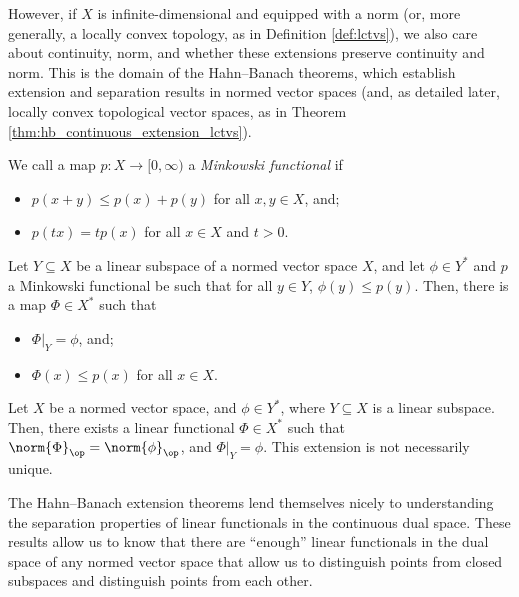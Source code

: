 However, if $X$ is infinite-dimensional and equipped with a norm (or, more generally, a locally convex topology, as in Definition \ref{def:lctvs}), we also care about continuity, norm, and whether these extensions preserve continuity and norm. This is the domain of the Hahn--Banach theorems, which establish extension and separation results in normed vector spaces (and, as detailed later, locally convex topological vector spaces, as in Theorem \ref{thm:hb_continuous_extension_lctvs}).
\begin{definition}
  We call a map $p\colon X\rightarrow [0,\infty)$ a \textit{Minkowski functional} if
  \begin{itemize}
    \item $p\left(x + y\right)\leq p\left(x\right) + p\left(y\right)$ for all $x,y\in X$, and;
    \item $p\left(tx\right) = tp\left(x\right)$ for all $x\in X$ and $t > 0$.
  \end{itemize}
\end{definition}
\begin{theorem}\label{thm:hbm_extension}
  Let $Y\subseteq X$ be a linear subspace of a normed vector space $X$, and let $\phi\in Y^{\ast}$ and $p$ a Minkowski functional be such that for all $y\in Y$, $\phi\left(y\right) \leq p\left(y\right)$. Then, there is a map $\Phi\in X^{\ast}$ such that
  \begin{itemize}
    \item $\Phi|_{Y} = \phi$, and;
    \item $\Phi\left(x\right) \leq p\left(x\right)$ for all $x\in X$.
  \end{itemize}
\end{theorem}
\begin{theorem}\label{thm:hb_continuous_extension}
  Let $X$ be a normed vector space, and $\phi\in Y^{\ast}$, where $Y\subseteq X$ is a linear subspace. Then, there exists a linear functional $\Phi\in X^{\ast}$ such that $\norm{\Phi}_{\op} = \norm{\phi}_{\op}$, and $\Phi|_{Y} = \phi$. This extension is not necessarily unique.
\end{theorem}
The Hahn--Banach extension theorems lend themselves nicely to understanding the separation properties of linear functionals in the continuous dual space. These results allow us to know that there are ``enough'' linear functionals in the dual space of any normed vector space that allow us to distinguish points from closed subspaces and distinguish points from each other.
